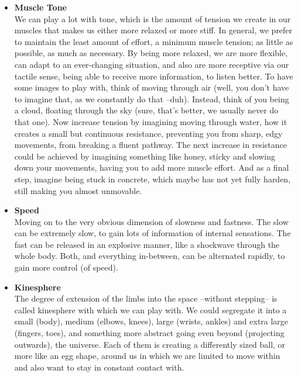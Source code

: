 \begin{itemize}
    \item [] \textbf{Muscle Tone} \\
    We can play a lot with tone, which is the amount of tension we create in our muscles that makes us either more relaxed or more stiff.
    In general, we prefer to maintain the least amount of effort, a minimum muscle tension; as little as possible, as much as necessary.
    By being more relaxed, we are more flexible, can adapt to an ever-changing situation, and also are more receptive via our tactile sense, being able to receive more information, to listen better.
    To have some images to play with, think of moving through air (well, you don't have to imagine that, as we constantly do that --duh).
    Instead, think of you being a cloud, floating through the sky (sure, that's better, we usually never do that one).
    Now increase tension by imagining moving through water, how it creates a small but continuous resistance, preventing you from sharp, edgy movements, from breaking a fluent pathway.
    The next increase in resistance could be achieved by imagining something like honey, sticky and slowing down your movements, having you to add more muscle effort.
    And as a final step, imagine being stuck in concrete, which maybe has not yet fully harden, still making you almost unmovable.

    \item [] \textbf{Speed} \\
    Moving on to the very obvious dimension of slowness and fastness.
    The slow can be extremely slow, to gain lots of information of internal sensations.
    The fast can be released in an explosive manner, like a shockwave through the whole body.
    Both, and everything in-between, can be alternated rapidly, to gain more control (of speed).

    \item [] \textbf{Kinesphere} \\
    The degree of extension of the limbs into the space --without stepping-- is called \gls{kinesphere} with which we can play with.
    We could segregate it into a small (body), medium (elbows, knees), large (wrists, ankles) and extra large (fingers, toes), and something more abstract going even beyond (projecting outwards), the universe.
    Each of them is creating a differently sized ball, or more like an egg shape, around us in which we are limited to move within and also want to stay in constant contact with.


\end{itemize}

